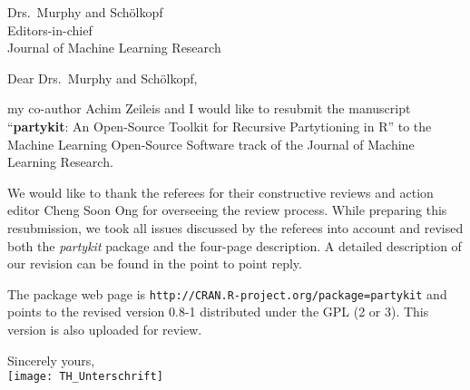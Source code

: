 \documentclass[ngerman,uzh]{scrlttr2}
\begin{document}

\begin{letter}{
Drs.~Murphy and Schölkopf \\
Editors-in-chief \\
Journal of Machine Learning Research}

\subject{JMLR-14-133 resubmission}

\opening{Dear Drs.~Murphy and Schölkopf,}

my co-author Achim Zeileis and I would like to resubmit the manuscript
``\textbf{partykit}: An Open-Source Toolkit for Recursive Partytioning in R'' to the
Machine Learning Open-Source Software track of the Journal of Machine
Learning Research.

We would like to thank the referees for their constructive reviews and
action editor Cheng Soon Ong for overseeing the review process. While
preparing this resubmission, we took all issues discussed by the referees
into account and revised both the \emph{partykit} package and the four-page
description. A detailed description of our revision can be found in the
point to point reply.

The package web page is \texttt{http://CRAN.R-project.org/package=partykit}
and points to the revised version 0.8-1 distributed under the GPL (2 or 3).
This version is also uploaded for review. 

Sincerely yours, \\
\texttt{[image: TH\_Unterschrift]}

\end{letter}
\end{document}
